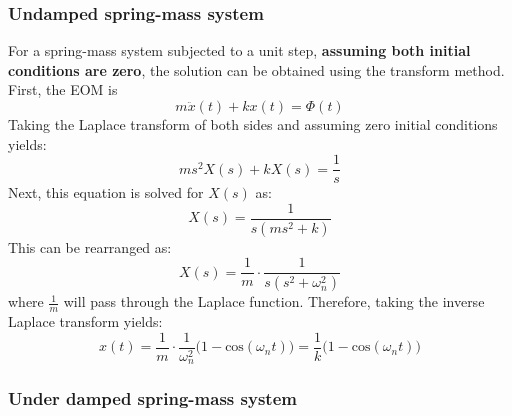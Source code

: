 \documentclass[12pt,letter]{article}
\numberwithin{ex}{section} %
\begin{document}
\subsubsection{Undamped spring-mass system}

For a spring-mass system subjected to a unit step, \textbf{assuming both initial conditions are zero}, the solution can be obtained using the transform method. First, the EOM is 
\begin{equation}
m\ddot{x}(t) + kx(t) = \Phi(t)
\end{equation}
Taking the Laplace transform of both sides and assuming zero initial conditions yields:
\begin{equation}
	ms^2X(s)+kX(s) =\frac{1}{s}
\end{equation}
Next, this equation is solved for $X(s)$ as:
\begin{equation}
	X(s) = \frac{1}{s(ms^2+k)}
\end{equation}
This can be rearranged as:
\begin{equation}
	X(s) = \frac{1}{m} \cdot \frac{1}{s(s^2+\omega_n^2)}
\end{equation}
where $\frac{1}{m}$ will pass through the Laplace function. Therefore, taking the inverse Laplace transform yields:
\begin{equation}
	x(t) = \frac{1}{m} \cdot \frac{1}{\omega_n^2}\big(1-\text{cos}(\omega_n t)\big) = \frac{1}{k}\big(1-\text{cos}(\omega_n t)\big)
\end{equation}
 
\subsubsection{Under damped spring-mass system}
\end{document}
